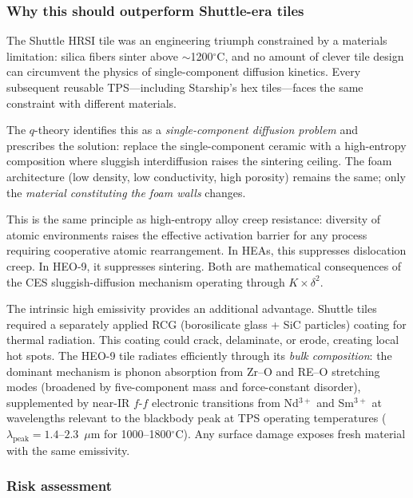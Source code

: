 \documentclass[12pt,letterpaper]{article}
\theoremstyle{definition}
\begin{document}
\subsubsection{Why this should outperform Shuttle-era tiles}

The Shuttle HRSI tile was an engineering triumph constrained by a materials limitation: silica fibers sinter above $\sim$1200$^\circ$C, and no amount of clever tile design can circumvent the physics of single-component diffusion kinetics.  Every subsequent reusable TPS---including Starship's hex tiles---faces the same constraint with different materials.

The $q$-theory identifies this as a \emph{single-component diffusion problem} and prescribes the solution: replace the single-component ceramic with a high-entropy composition where sluggish interdiffusion raises the sintering ceiling.  The foam architecture (low density, low conductivity, high porosity) remains the same; only the \emph{material constituting the foam walls} changes.

This is the same principle as high-entropy alloy creep resistance: diversity of atomic environments raises the effective activation barrier for any process requiring cooperative atomic rearrangement.  In HEAs, this suppresses dislocation creep.  In HEO-9, it suppresses sintering.  Both are mathematical consequences of the CES sluggish-diffusion mechanism operating through $K \times \delta^2$.

The intrinsic high emissivity provides an additional advantage.  Shuttle tiles required a separately applied RCG (borosilicate glass + SiC particles) coating for thermal radiation.  This coating could crack, delaminate, or erode, creating local hot spots.  The HEO-9 tile radiates efficiently through its \emph{bulk composition}: the dominant mechanism is phonon absorption from Zr--O and RE--O stretching modes (broadened by five-component mass and force-constant disorder), supplemented by near-IR $f$-$f$ electronic transitions from Nd$^{3+}$ and Sm$^{3+}$ at wavelengths relevant to the blackbody peak at TPS operating temperatures ($\lambda_{\mathrm{peak}} = 1.4$--$2.3$~$\mu$m for 1000--1800$^\circ$C).  Any surface damage exposes fresh material with the same emissivity.

\subsubsection{Risk assessment}
\end{document}
